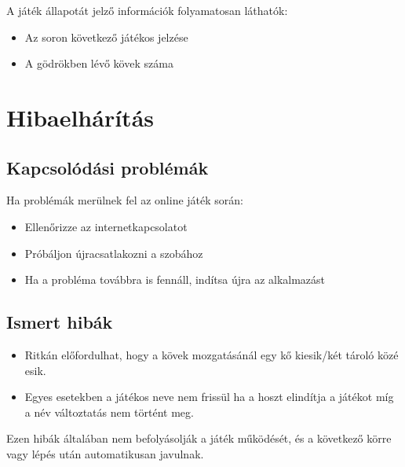 A játék állapotát jelző információk folyamatosan láthatók:
\begin{itemize}
	\item Az soron következő játékos jelzése
	\item A gödrökben lévő kövek száma
\end{itemize}

\section{Hibaelhárítás}

\subsection{Kapcsolódási problémák}
Ha problémák merülnek fel az online játék során:
\begin{itemize}
	\item Ellenőrizze az internetkapcsolatot
	\item Próbáljon újracsatlakozni a szobához
	\item Ha a probléma továbbra is fennáll, indítsa újra az alkalmazást
\end{itemize}

\subsection{Ismert hibák}
\begin{itemize}
	\item Ritkán előfordulhat, hogy a kövek mozgatásánál egy kő kiesik/két tároló közé esik.
	\item Egyes esetekben a játékos neve nem frissül ha a hoszt elindítja a játékot míg a név változtatás nem történt meg.
\end{itemize}

Ezen hibák általában nem befolyásolják a játék működését, és a következő körre vagy lépés után automatikusan javulnak.